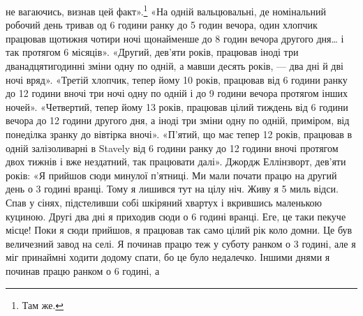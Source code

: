 \parcont{}  %
не вагаючись, визнав цей факт».\footnote{
Там же.
} «На одній вальцювальні, де
номінальний робочий день тривав од 6 години ранку до 5  годин
вечора, один хлопчик працював щотижня чотири ночі щонайменше
до 8 годин вечора другого дня\dots{} і так протягом
6 місяців». «Другий, дев’яти років, працював іноді три дванадцятигодинні
зміни одну по одній, а мавши десять років, — два дні й
дві ночі вряд». «Третій хлопчик, тепер йому 10 років, працював
від 6 години ранку до 12 години вночі три ночі одну по одній і
до 9 години вечора протягом інших ночей». «Четвертий, тепер
йому 13 років, працював цілий тиждень від 6 години вечора до
12 години другого дня, а іноді три зміни одну по одній, приміром,
від понеділка зранку до вівтірка вночі». «П’ятий, що має тепер
12 років, працював в одній залізоливарні в Stavely від 6 години
ранку до 12 години вночі протягом двох тижнів і вже нездатний,
так працювати далі». Джордж Еллінзворт, дев’яти років: «Я прийшов
сюди минулої п’ятниці. Ми мали почати працю на другий
день о 3 годині вранці. Тому я лишився тут на цілу ніч. Живу я
5 миль відси. Спав у сінях, підстеливши собі шкіряний хвартух
і вкрившись маленькою куциною. Другі два дні я приходив сюди
о 6 годині вранці. Еге, це таки пекуче місце! Поки я сюди прийшов,
я працював так само цілий рік коло домни. Це був величезний
завод на селі. Я починав працю теж у суботу ранком о 3 годині, але я міг
принаймні ходити додому спати, бо це було
недалечко. Іншими днями я починав працю ранком о 6 годині, а
